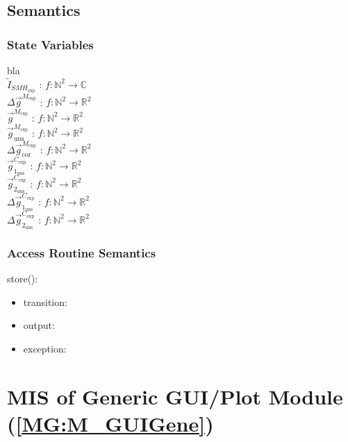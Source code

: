\documentclass[12pt, titlepage]{article}
\begin{document}
\subsection{Semantics}

\subsubsection{State Variables}

bla \\
$\widetilde{I}_{\mathit{SMH}_{\text{exp}}}$ : $f:\mathbb{N}^2\rightarrow\mathbb{C}$ \\
$\Delta \overrightarrow{g}^{M_{\text{exp}}}$ : $f:\mathbb{N}^2\rightarrow\mathbb{R}^2$\\
$\overrightarrow{g}^{M_{\text{exp}}}$ : $f:\mathbb{N}^2\rightarrow\mathbb{R}^2$\\
$\overrightarrow{g}_{\text{uns}}^{M_{\text{exp}}}$ : $f:\mathbb{N}^2\rightarrow\mathbb{R}^2$\\
$\Delta\overrightarrow{g}_{\text{cor}}^{M_{\text{exp}}}$ : $f:\mathbb{N}^2\rightarrow\mathbb{R}^2$\\
$\overrightarrow{g}_{1_{\text{uns}}}^{C_{\text{exp}}}$ : $f:\mathbb{N}^2\rightarrow\mathbb{R}^2$\\
$\overrightarrow{g}_{2_{\text{uns}}}^{C_{\text{exp}}}$ : $f:\mathbb{N}^2\rightarrow\mathbb{R}^2$\\
$\Delta \overrightarrow{g}_{1_{\text{uns}}}^{C_{\text{exp}}}$ : $f:\mathbb{N}^2\rightarrow\mathbb{R}^2$\\
$\Delta \overrightarrow{g}_{2_{\text{uns}}}^{C_{\text{exp}}}$ : $f:\mathbb{N}^2\rightarrow\mathbb{R}^2$\\

\subsubsection{Access Routine Semantics}

\noindent store():
\begin{itemize}
\item transition:  
\item output:  
\item exception:  
\end{itemize}

\section{MIS of Generic GUI/Plot Module (\texorpdfstring{\cref{MG:M_GUIGene}}))} \label{MIS_GUIGene}
\end{document}
